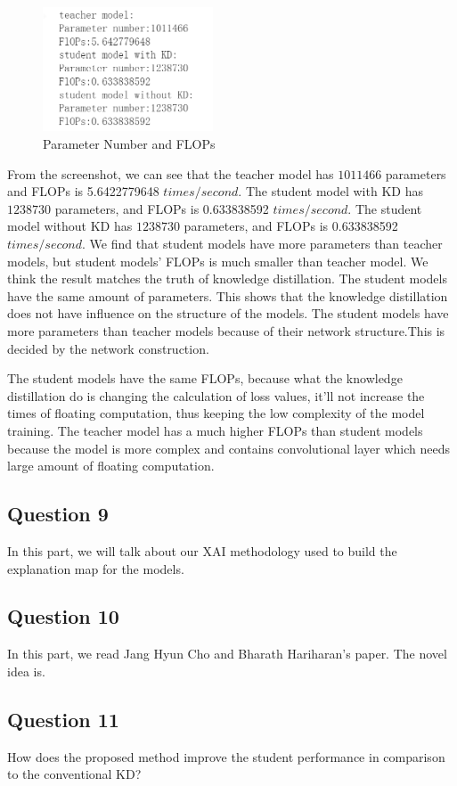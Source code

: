 \documentclass[conference]{IEEEtran}
\begin{document}
\begin{figure}[h] 
    \centering
    \includegraphics[width=0.45\textwidth]{./graphs/T1Q8.png}
    \caption{Parameter Number and FLOPs}
    \label{Fig.t1q3e}
\end{figure}
From the screenshot, we can see that the teacher model has $1011466$ parameters and FLOPs is 5.6422779648 $times/second$. 
The student model with KD has $1238730$ parameters, and FLOPs is 0.633838592 $times/second$. 
The student model without KD has $1238730$ parameters, and FLOPs is 0.633838592 $times/second$. 
We find that student models have more parameters than teacher models, but student models' FLOPs is much smaller than teacher model. We think the result matches the truth of knowledge distillation.
The student models have the same amount of parameters. This shows that the knowledge distillation does not have influence on the structure of the models. The student models have more parameters than teacher models because of their network structure.This is decided by the network construction. \par
The student models have the same FLOPs, because what the knowledge distillation do is changing the calculation of loss values, it'll not increase the times of floating computation, thus keeping the low complexity of the model training. The teacher model has a much higher FLOPs than student models because the model is more complex and contains convolutional layer which needs large amount of floating computation.
\subsection{Question 9}
In this part, we will talk about our XAI methodology used to build the explanation map for the models.
\subsection{Question 10}
In this part, we read Jang Hyun Cho and Bharath Hariharan's\cite{b2} paper. The novel idea is.
\subsection{Question 11}
How does the proposed method improve the student performance in comparison to the conventional KD?
\end{document}
